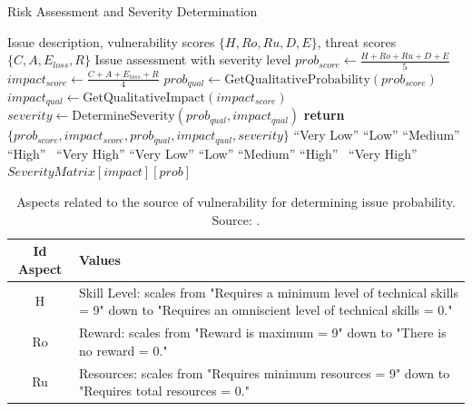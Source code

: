 \documentclass[conference]{IEEEtran}
\begin{document}
\begin{algorithm}[!t]
\caption{Risk Assessment and Severity Determination}
\label{alg:risk_assessment}
\small
\begin{algorithmic}[1]
\Require Issue description, vulnerability scores $\{H, Ro, Ru, D, E\}$, threat scores $\{C, A, E_{loss}, R\}$
\Ensure Issue assessment with severity level
\State $prob_{score} \gets \frac{H + Ro + Ru + D + E}{5}$
\State $impact_{score} \gets \frac{C + A + E_{loss} + R}{4}$
\State $prob_{qual} \gets \text{GetQualitativeProbability}(prob_{score})$
\State $impact_{qual} \gets \text{GetQualitativeImpact}(impact_{score})$
\State $severity \gets \text{DetermineSeverity}(prob_{qual}, impact_{qual})$
\State \textbf{return} $\{prob_{score}, impact_{score}, prob_{qual}, impact_{qual}, severity\}$
   \Return ``Very Low''
   \Return ``Low''
   \Return ``Medium''
   \Return ``High''
  \Else\ \Return ``Very High''
  \EndIf
\EndFunction
{}
   \Return ``Very Low''
   \Return ``Low''
   \Return ``Medium''
   \Return ``High''
  \Else\ \Return ``Very High''
  \EndIf
\EndFunction
{}
  \State \Return $SeverityMatrix[impact][prob]$ 
\EndFunction
\end{algorithmic}
\end{algorithm}

\begin{table}[!t]
\centering
\caption{Aspects related to the source of vulnerability for determining issue probability. Source: \cite{ref1}.}
\label{tab:table6}
\small
\begin{tabularx}{\linewidth}{@{}c L@{}}
\toprule
Id Aspect & Values \\
\midrule
H & Skill Level: scales from "Requires a minimum level of technical skills = 9" down to "Requires an omniscient level of technical skills = 0." \\
Ro & Reward: scales from "Reward is maximum = 9" down to "There is no reward = 0." \\
Ru & Resources: scales from "Requires minimum resources = 9" down to "Requires total resources = 0." \\
\bottomrule
\end{tabularx}
\end{table}
\end{document}
